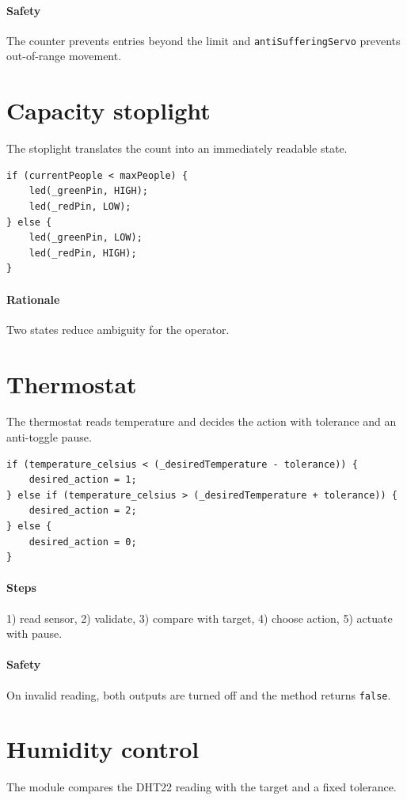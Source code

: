 \paragraph{Safety} The counter prevents entries beyond the limit and \texttt{antiSufferingServo} prevents out-of-range movement.

\section{Capacity stoplight}
The stoplight translates the count into an immediately readable state.

\begin{lstlisting}[style=cppstyle]
if (currentPeople < maxPeople) {
    led(_greenPin, HIGH);
    led(_redPin, LOW);
} else {
    led(_greenPin, LOW);
    led(_redPin, HIGH);
}
\end{lstlisting}

\paragraph{Rationale} Two states reduce ambiguity for the operator.

\section{Thermostat}
The thermostat reads temperature and decides the action with tolerance and an anti-toggle pause.

\begin{lstlisting}[style=cppstyle]
if (temperature_celsius < (_desiredTemperature - tolerance)) {
    desired_action = 1;
} else if (temperature_celsius > (_desiredTemperature + tolerance)) {
    desired_action = 2;
} else {
    desired_action = 0;
}
\end{lstlisting}

\paragraph{Steps} 1) read sensor, 2) validate, 3) compare with target, 4) choose action, 5) actuate with pause.

\paragraph{Safety} On invalid reading, both outputs are turned off and the method returns \texttt{false}.

\section{Humidity control}
The module compares the DHT22 reading with the target and a fixed tolerance.

